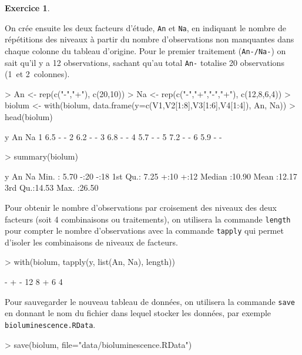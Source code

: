 \documentclass[11pt]{report}
\theoremstyle{definition}
\newtheorem{exo}{Exercice}[chapter]
\begin{document}
\begin{exo}
\begin{sol}
On crée ensuite les deux facteurs d'étude, \texttt{An} et \texttt{Na}, en
indiquant le nombre de répétitions des niveaux à partir du nombre
d'observations non manquantes dans chaque colonne du tableau d'origine. Pour
le premier traitement (\texttt{An-/Na-}) on sait qu'il y a 12 observations,
sachant qu'au total \texttt{An-} totalise 20 observations (1\iere\ et
2\ieme\ colonnes).
\begin{Schunk}
\begin{Sinput}
> An <- rep(c("-","+"), c(20,10))
> Na <- rep(c("-","+","-","+"), c(12,8,6,4))
> biolum <- with(biolum, data.frame(y=c(V1,V2[1:8],V3[1:6],V4[1:4]), An, Na))
> head(biolum)
\end{Sinput}
\begin{Soutput}
    y An Na
1 6.5  -  -
2 6.2  -  -
3 6.8  -  -
4 5.7  -  -
5 7.2  -  -
6 5.9  -  -
\end{Soutput}
\begin{Sinput}
> summary(biolum)
\end{Sinput}
\begin{Soutput}
       y         An     Na    
 Min.   : 5.70   -:20   -:18  
 1st Qu.: 7.25   +:10   +:12  
 Median :10.90                
 Mean   :12.17                
 3rd Qu.:14.53                
 Max.   :26.50                
\end{Soutput}
\end{Schunk}

Pour obtenir le nombre d'observations par croisement des niveaux des deux
facteurs (soit 4 combinaisons ou traitements), on utilisera la commande
\texttt{length} pour compter le nombre d'observations avec la commande
\texttt{tapply} qui permet d'isoler les combinaisons de niveaux de facteurs.
\begin{Schunk}
\begin{Sinput}
> with(biolum, tapply(y, list(An, Na), length))
\end{Sinput}
\begin{Soutput}
   - +
- 12 8
+  6 4
\end{Soutput}
\end{Schunk}

Pour sauvegarder le nouveau tableau de données, on utilisera la commande
\texttt{save} en donnant le nom du fichier dans lequel stocker les données,
par exemple \texttt{bioluminescence.RData}.
\begin{Schunk}
\begin{Sinput}
> save(biolum, file="data/bioluminescence.RData")
\end{Sinput}
\end{Schunk}
\end{sol}
\end{exo}
\end{document}
